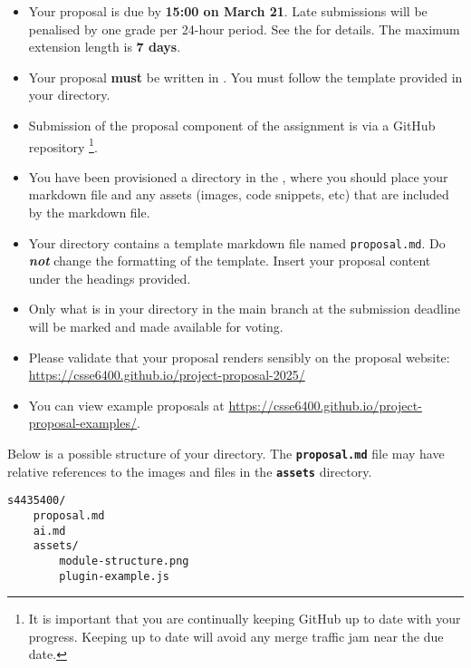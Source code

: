 \documentclass{csse4400}
\begin{document}
\begin{itemize}[topsep=4pt,partopsep=1pt,itemsep=5pt,parsep=2pt]
    \item Your proposal is due by \textbf{15:00 on March 21}. Late submissions will be penalised by one grade per 24-hour period. See the  for details. The maximum extension length is \textbf{7 days}.
    \item Your proposal \textbf{must} be written in .
          You must follow the template provided in your directory.
    \item Submission of the proposal component of the assignment is via a GitHub repository%
             \footnote{It is important that you are continually keeping GitHub up to date with your progress.
              Keeping up to date will avoid any merge traffic jam near the due date.}.
    \item You have been provisioned a directory in the ,
          where you should place your markdown file and any assets (images, code snippets, etc) that are included by the markdown file.
    \item Your directory contains a template markdown file named \texttt{proposal.md}.
          Do \textbf{\textit{not}} change the formatting of the template.
          Insert your proposal content under the headings provided.
    \item Only what is in your directory in the main branch at the submission deadline will be marked and made available for voting.
    \item Please validate that your proposal renders sensibly on the proposal website:\\
        \url{https://csse6400.github.io/project-proposal-2025/}
    \item You can view example proposals at \url{https://csse6400.github.io/project-proposal-examples/}.
\end{itemize}

\begin{samepage}
\noindent
Below is a possible structure of your directory.
The \textbf{\texttt{proposal.md}} file may have relative references to the images and files in the \textbf{\texttt{assets}} directory.
\end{samepage}

\begin{minipage}{\textwidth}
\begin{verbatim}
s4435400/
    proposal.md
    ai.md
    assets/
        module-structure.png
        plugin-example.js
\end{verbatim}
\end{minipage}
\end{document}
